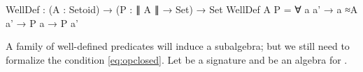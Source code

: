 \begin{spec}
  WellDef : (A : Setoid) → (P : ∥ A ∥ → Set) → Set
  WellDef A P = ∀ {a a'} → a ≈A a' → P a → P a'
\end{spec}
\noindent A family of well-defined predicates will induce a subalgebra;
but we still need to formalize the condition \eqref{eq:opclosed}.  Let
 be a signature and  be an algebra for .
\begin{code}
\>[0]\AgdaSpace{}%
\AgdaSymbol{:}\AgdaSpace{}%
\AgdaSpace{}%
\AgdaSymbol{\{}\AgdaSpace{}%
\AgdaSpace{}%
\AgdaSpace{}%
\AgdaSymbol{\}}\AgdaSpace{}%
\AgdaSpace{}%
\AgdaSymbol{(}\AgdaSpace{}%
\AgdaSymbol{:}\AgdaSpace{}%
\AgdaSpace{}%
\AgdaSymbol{\{}\AgdaSymbol{\}}\AgdaSpace{}%
\AgdaSymbol{\{}\AgdaSymbol{\}}\AgdaSpace{}%
\AgdaSymbol{)}\AgdaSpace{}%
\AgdaSpace{}%
\AgdaSymbol{(}\AgdaSpace{}%
\AgdaSymbol{:}\AgdaSpace{}%
\AgdaSpace{}%
\AgdaSymbol{(}\AgdaSpace{}%
\AgdaSymbol{)}\AgdaSpace{}%
\AgdaSymbol{)}\AgdaSpace{}%
\AgdaSpace{}%
\AgdaSpace{}%
\AgdaSymbol{\AgdaUnderscore{}}\<%
\\
\>[0]\AgdaSpace{}%
\AgdaSymbol{\{}\AgdaSpace{}%
\AgdaSymbol{=}\AgdaSpace{}%
\AgdaSymbol{\}}\AgdaSpace{}%
\AgdaSymbol{\{}\AgdaSpace{}%
\AgdaSymbol{=}\AgdaSpace{}%
\AgdaSymbol{\}}\AgdaSpace{}%
\AgdaSpace{}%
\AgdaSpace{}%
\AgdaSymbol{=}\AgdaSpace{}%
\AgdaSpace{}%
\AgdaSymbol{\{}\AgdaSpace{}%
\AgdaSymbol{\}}\AgdaSpace{}%
\AgdaSymbol{(}\AgdaSpace{}%
\AgdaSymbol{:}\AgdaSpace{}%
\AgdaSpace{}%
\AgdaSpace{}%
\AgdaSymbol{(}\AgdaSpace{}%
\AgdaOperator{\AgdaInductiveConstructor{,}}\AgdaSpace{}%
\AgdaSymbol{))}\AgdaSpace{}%
\AgdaSpace{}%
\AgdaSymbol{(}\AgdaSpace{}%
\AgdaSpace{}%
\AgdaSpace{}%
\AgdaSpace{}%
\AgdaSymbol{\{}\AgdaSymbol{\})}\AgdaSpace{}%
\AgdaSymbol{(}\AgdaSpace{}%
\AgdaSpace{}%
\AgdaSpace{}%
\AgdaSpace{}%
\AgdaSymbol{)}\<%
\\
\end{code}
